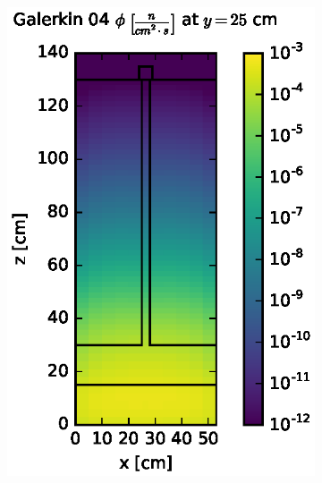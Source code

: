 \begin{figure}[!htb]
\begin{subfigure}{0.4\textwidth}
\includegraphics[max height=0.445\textheight]
{img/steel-plots/fwd/flux-gkn04-slice.eps}
\end{subfigure}
\\
\begin{subfigure}{0.4\textwidth}

\end{subfigure}
\end{figure}
